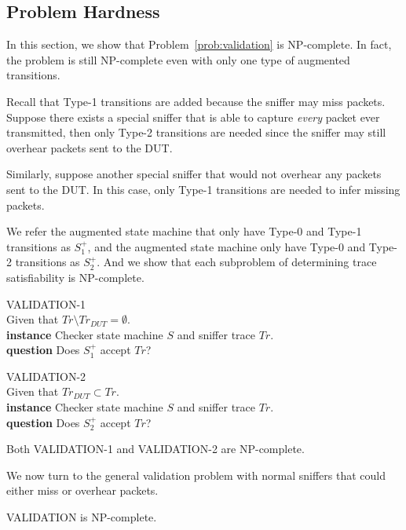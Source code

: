 \subsection{Problem Hardness}
\label{subsec:hard}

In this section, we show that Problem~\ref{prob:validation} is NP-complete.  In
fact, the problem is still NP-complete even with only one type of augmented
transitions.

Recall that Type-1 transitions are added because the sniffer may miss packets.
Suppose there exists a special sniffer that is able to capture \textit{every}
packet ever transmitted, then only Type-2 transitions are needed since the
sniffer may still overhear packets sent to the DUT.

Similarly, suppose another special sniffer that would not overhear any packets
sent to the DUT. In this case, only Type-1 transitions are needed to infer
missing packets.

We refer the augmented state machine that only have Type-0 and Type-1
transitions as $S^+_1$, and the augmented state machine only have Type-0 and
Type-2 transitions as $S^+_2$. And we show that each subproblem of determining
trace satisfiability is NP-complete.

\begin{problem}
  VALIDATION-1\\
  Given that $Tr\setminus Tr_{DUT}=\emptyset$.\\
  \textbf{instance} Checker state machine $S$ and sniffer trace $Tr$.\\
  \textbf{question} Does $S^+_1$ accept $Tr$?
\end{problem}

\begin{problem}
  VALIDATION-2\\
  Given that $Tr_{DUT} \subset Tr$.\\
  \textbf{instance} Checker state machine $S$ and sniffer trace $Tr$.\\
  \textbf{question} Does $S^+_2$ accept $Tr$?
\end{problem}

\begin{lemma}
  Both VALIDATION-1 and VALIDATION-2 are NP-complete.
\end{lemma}

We now turn to the general validation problem with normal sniffers that could
either miss or overhear packets.

\begin{theorem}
  VALIDATION is NP-complete.
\end{theorem}
